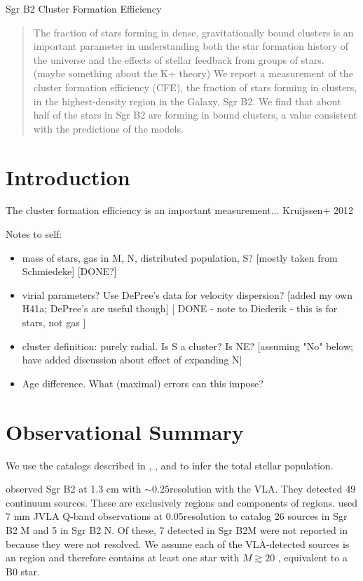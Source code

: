 \documentclass[twocolumn]{aastex61}
\begin{document}
Sgr B2 Cluster Formation Efficiency

\begin{abstract}
    The fraction of stars forming in dense, gravitationally bound clusters is
    an important parameter in understanding both the star formation history of
    the universe and the effects of stellar feedback from groups of stars.
    (maybe something about the K+ theory)
    We report a measurement of the cluster formation efficiency (CFE), the
    fraction of stars forming in clusters, in the highest-density region in
    the Galaxy, Sgr B2.  We find that about half of the stars in Sgr B2
    are forming in bound clusters, a value consistent with the predictions
    of the \citet{Kruijssen2012a} models.
\end{abstract}

\section{Introduction}

The cluster formation efficiency is an important measurement...
Kruijssen+ 2012

Notes to self:
\begin{itemize}
    \item mass of stars, gas in M, N, distributed population, S? [mostly taken from Schmiedeke] [DONE?]
    \item virial parameters?  Use DePree's data for velocity dispersion?  [added my own H41a; DePree's are useful though] [ DONE - note to Diederik - this is for stars, not gas ]
    \item cluster definition: purely radial.  Is S a cluster?  Is NE?  [assuming "No" below; have added discussion about effect of expanding N]
    \item Age difference.  What (maximal) errors can this impose?
\end{itemize}

\section{Observational Summary}

We use the catalogs described in \citet{Ginsburg2018a}, \citet{Gaume1995a}, and
\citet{De-Pree2015a} to infer the total stellar population.

\citet{Gaume1995a} observed Sgr B2 at 1.3 cm with $\sim0.25$\arcsec resolution
with the VLA.  They detected 49 continuum sources.  These are exclusively \hii
regions and components of \hii regions.  \citet{De-Pree2015a} used 7 mm JVLA
Q-band observations at 0.05\arcsec resolution to catalog 26 sources in Sgr B2 M
and 5 in Sgr B2 N.  Of these, 7 detected in Sgr B2M were not reported in
\citet{Gaume1995a} because they were not resolved.  We assume each of the
VLA-detected sources is an \hii region and therefore contains at least one star
with $M\gtrsim20$ \msun, equivalent to a B0 star.
\end{document}

